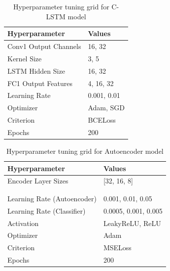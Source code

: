 \documentclass[10pt,twocolumn,letterpaper]{article}
\begin{document}
\begin{table}[h]
   \centering
   \caption{Hyperparameter tuning grid for C-LSTM model}
   \label{clstm-tuning-matrix}
   \begin{tabular}{|l|l|}
   \hline
   \textbf{Hyperparameter}   & \textbf{Values}         \\ \hline
   Conv1 Output Channels     & 16, 32                  \\ \hline
   Kernel Size               & 3, 5                    \\ \hline
   LSTM Hidden Size          & 16, 32                  \\ \hline
   FC1 Output Features       & 4, 16, 32               \\ \hline
   Learning Rate             & 0.001, 0.01             \\ \hline
   Optimizer                 & Adam, SGD               \\ \hline
   Criterion                 & BCELoss                 \\ \hline
   Epochs                    & 200                     \\ \hline
   \end{tabular}
   \end{table}

\begin{table}[h]
      \centering
      \caption{Hyperparameter tuning grid for Autoencoder model}
      \label{autoenc-tuning-matrix}
      \begin{tabular}{|l|l|}
      \hline
      \textbf{Hyperparameter}               & \textbf{Values}                                 \\ \hline
      Encoder Layer Sizes                   & [32, 16, 8] \\ [64, 32, 16] \\[128, 64, 32]     \\ \hline
      Learning Rate (Autoencoder)           & 0.001, 0.01, 0.05                               \\ \hline
      Learning Rate (Classifier)            & 0.0005, 0.001, 0.005                            \\ \hline
      Activation                            & LeakyReLU, ReLU                                 \\ \hline
      Optimizer                             & Adam                                            \\ \hline
      Criterion                             & MSELoss                                         \\ \hline
      Epochs                                & 200                                             \\ \hline
      \end{tabular}
      \end{table}
\end{document}

